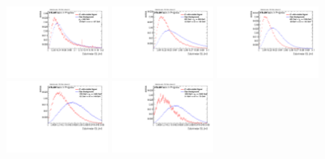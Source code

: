 \begin{figure}[H]
\includegraphics[width=0.3\textwidth]{sascha_input/Appendix/Distributions/higgs/distributions/beta2/h_recoJet_C2_2_bin1.pdf} \hspace{1mm}
\includegraphics[width=0.3\textwidth]{sascha_input/Appendix/Distributions/higgs/distributions/beta2/h_recoJet_C2_2_bin2.pdf} \hspace{4mm}
\includegraphics[width=0.3\textwidth]{sascha_input/Appendix/Distributions/higgs/distributions/beta2/h_recoJet_C2_2_bin3.pdf} 
\bigskip
\includegraphics[width=0.3\textwidth]{sascha_input/Appendix/Distributions/higgs/distributions/beta2/h_recoJet_C2_2_bin4.pdf} \hspace{4mm}
\includegraphics[width=0.3\textwidth]{sascha_input/Appendix/Distributions/higgs/distributions/beta2/h_recoJet_C2_2_bin5.pdf} 


\end{figure}
